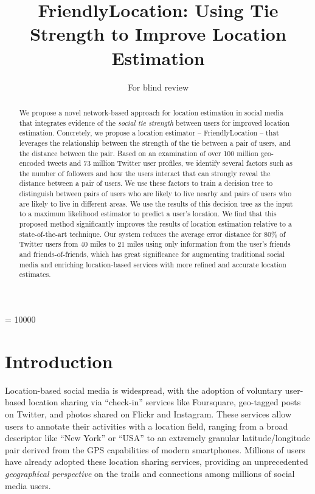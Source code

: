 \documentclass{sig-alternate}
\begin{document}
 {}
\crdata{}
\widowpenalty = 10000

\author{
\alignauthor
For blind review
}

\title{FriendlyLocation: Using Tie Strength to Improve Location Estimation}

\maketitle
\begin{abstract}
We propose a novel network-based approach for location estimation in social
media that integrates evidence of the \textit{social tie strength} between
users for improved location estimation.
%
Concretely, we propose a location
estimator -- FriendlyLocation -- that leverages the relationship between the
strength of the tie between a pair of users, and the distance between the pair.
%
Based on an examination of over 100 million geo-encoded tweets and 73 million
Twitter user profiles, we identify several factors such as the
number of followers and how the users interact that can strongly reveal the
distance between a pair of users.
%
We use these factors to train a decision
tree to distinguish between pairs of users who are likely to live nearby and pairs of
users who are likely to live in different areas.
%
We use the results of this decision tree as the input to a maximum likelihood
estimator to predict a user's location.
We find that this proposed method significantly improves the results of
location estimation relative to a state-of-the-art technique.
Our system reduces the average error distance for 80\% of Twitter users from 40
miles to 21 miles using only information from the user's friends and
friends-of-friends,  which has great significance for augmenting traditional
social media and enriching location-based services with more refined and
accurate location estimates.
%
\end{abstract}

\section{Introduction}
Location-based social media is widespread, with the adoption of voluntary
user-based location sharing via ``check-in'' services like Foursquare,
geo-tagged posts on Twitter, and photos shared on Flickr and Instagram.
%
These services allow users to annotate their activities with a location field,
ranging from a broad descriptor like ``New York'' or ``USA'' to an extremely
granular latitude/longitude pair  derived from the GPS capabilities of modern
smartphones.
%
Millions of users have already adopted these location sharing services,
providing an unprecedented \textit{geographical perspective} on the trails and
connections among millions of social media users.
\end{document}
